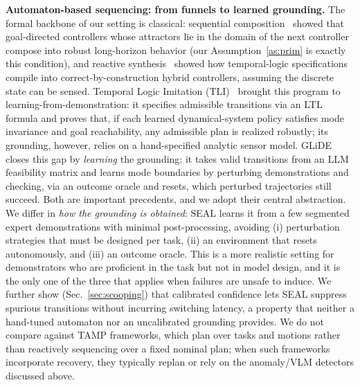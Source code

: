 \textbf{Automaton-based sequencing: from funnels to learned grounding.} The formal backbone of our setting is classical: sequential composition~\cite{burridge1999sequential} showed that goal-directed controllers whose attractors lie in the domain of the next controller compose into robust long-horizon behavior (our Assumption~\ref{as:prim} is exactly this condition), and reactive synthesis~\cite{kressgazit2009temporal} showed how temporal-logic specifications compile into correct-by-construction hybrid controllers, assuming the discrete state can be sensed. Temporal Logic Imitation (TLI)~\cite{wang2022temporal} brought this program to learning-from-demonstration: it specifies admissible transitions via an LTL formula and proves that, if each learned dynamical-system policy satisfies mode invariance and goal reachability, any admissible plan is realized robustly; its grounding, however, relies on a hand-specified analytic sensor model. GLiDE~\cite{wang2024grounding} closes this gap by \emph{learning} the grounding: it takes valid transitions from an LLM feasibility matrix and learns mode boundaries by perturbing demonstrations and checking, via an outcome oracle and resets, which perturbed trajectories still succeed. Both are important precedents, and we adopt their central abstraction. We differ in \emph{how the grounding is obtained}: SEAL learns it from a few segmented expert demonstrations with minimal post-processing, avoiding (i) perturbation strategies that must be designed per task, (ii) an environment that resets autonomously, and (iii) an outcome oracle. This is a more realistic setting for demonstrators who are proficient in the task but not in model design, and it is the only one of the three that applies when failures are unsafe to induce. We further show (Sec.~\ref{sec:scooping}) that calibrated confidence lets SEAL suppress spurious transitions without incurring switching latency, a property that neither a hand-tuned automaton nor an uncalibrated grounding provides. We do not compare against TAMP frameworks, which plan over tasks and motions rather than reactively sequencing over a fixed nominal plan; when such frameworks incorporate recovery, they typically replan or rely on the anomaly/VLM detectors discussed above.

